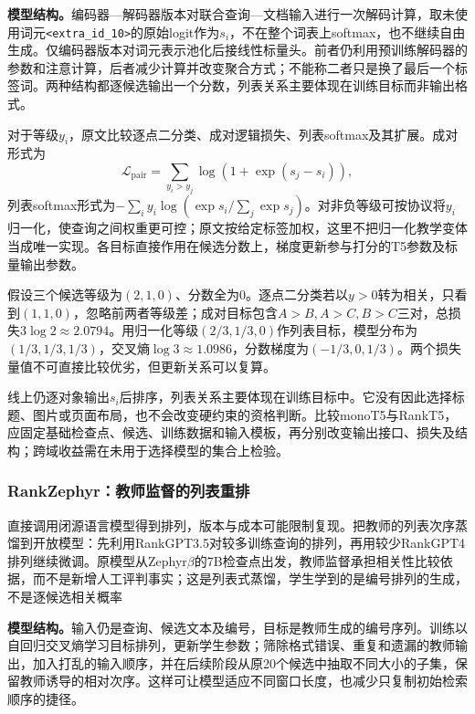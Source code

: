 \textbf{模型结构。}编码器—解码器版本对联合查询—文档输入进行一次解码计算，取未使用词元\texttt{<extra\_id\_10>}的原始logit作为$s_i$，不在整个词表上softmax，也不继续自由生成。仅编码器版本对词元表示池化后接线性标量头。前者仍利用预训练解码器的参数和注意计算，后者减少计算并改变聚合方式；不能称二者只是换了最后一个标签词。两种结构都逐候选输出一个分数，列表关系主要体现在训练目标而非输出格式。

对于等级$y_i$，原文比较逐点二分类、成对逻辑损失、列表softmax及其扩展。成对形式为
\begin{equation}
 \mathcal L_{\mathrm{pair}}=
 \sum_{y_i>y_j}\log(1+\exp(s_j-s_i)),
 \label{eq:rs-search-rankt5}
\end{equation}
列表softmax形式为$-\sum_i y_i\log(\exp s_i/\sum_j\exp s_j)$。对非负等级可按协议将$y_i$归一化，使查询之间权重更可控；原文按给定标签加权，这里不把归一化教学变体当成唯一实现。各目标直接作用在候选分数上，梯度更新参与打分的T5参数及标量输出参数。

假设三个候选等级为$(2,1,0)$、分数全为0。逐点二分类若以$y>0$转为相关，只看到$(1,1,0)$，忽略前两者等级差；成对目标包含$A>B,A>C,B>C$三对，总损失$3\log2\approx2.0794$。用归一化等级$(2/3,1/3,0)$作列表目标，模型分布为$(1/3,1/3,1/3)$，交叉熵$\log3\approx1.0986$，分数梯度为$(-1/3,0,1/3)$。两个损失量值不可直接比较优劣，但更新关系可以复算。

线上仍逐对象输出$s_i$后排序，列表关系主要体现在训练目标中。它没有因此选择标题、图片或页面布局，也不会改变硬约束的资格判断。比较monoT5与RankT5，应固定基础检查点、候选、训练数据和输入模板，再分别改变输出接口、损失及结构；跨域收益需在未用于选择模型的集合上检验。

\Needspace{100mm}
\subsubsection{RankZephyr：教师监督的列表重排}
\label{sec:rs-search-rankzephyr}

直接调用闭源语言模型得到排列，版本与成本可能限制复现。把教师的列表次序蒸馏到开放模型：先利用RankGPT3.5对较多训练查询的排列，再用较少RankGPT4排列继续微调。原模型从Zephyr$\beta$的7B检查点出发，教师监督承担相关性比较依据，而不是新增人工评判事实；这是列表式蒸馏，学生学到的是编号排列的生成，不是逐候选相关概率

\textbf{模型结构。}输入仍是查询、候选文本及编号，目标是教师生成的编号序列。训练以自回归交叉熵学习目标排列，更新学生参数；筛除格式错误、重复和遗漏的教师输出，加入打乱的输入顺序，并在后续阶段从原20个候选中抽取不同大小的子集，保留教师诱导的相对次序。这样可让模型适应不同窗口长度，也减少只复制初始检索顺序的捷径。

